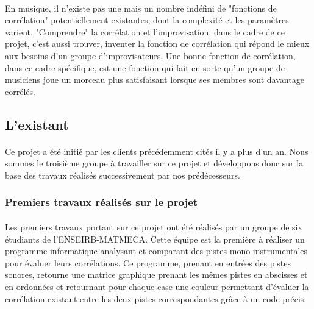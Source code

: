 \paragraph{}
En musique, il n'existe pas une mais un nombre indéfini de "fonctions
de corrélation" potentiellement existantes, dont la complexité et les
paramètres varient. "Comprendre" la corrélation et l'improvisation,
dans le cadre de ce projet, c'est aussi trouver, inventer la fonction
de corrélation qui répond le mieux aux besoins d'un groupe
d'improvisateurs. Une bonne fonction de corrélation, dans ce cadre
spécifique, est une fonction qui fait en sorte qu'un groupe de
musiciens joue un morceau plus satisfaisant lorsque ses membres sont
davantage corrélés.

\subsection{L'existant}
\paragraph{}
Ce projet a été initié par les clients précédemment cités il y a plus
d'un an. Nous sommes le troisième groupe à travailler sur ce projet et
développons donc sur la base des travaux réalisés successivement par
nos prédécesseurs.

\subsubsection{Premiers travaux réalisés sur le projet}
\paragraph{}
Les premiers travaux portant sur ce projet ont été réalisés par un
groupe de six étudiants de l'ENSEIRB-MATMECA. Cette équipe est la
première à réaliser un programme informatique analysant et comparant
des pistes mono-instrumentales pour évaluer leurs corrélations. Ce
programme, prenant en entrées des pistes sonores, retourne une matrice
graphique prenant les mêmes pistes en abscisses et en ordonnées et
retournant pour chaque case une couleur permettant d'évaluer la
corrélation existant entre les deux pistes correspondantes grâce à un
code précis.

